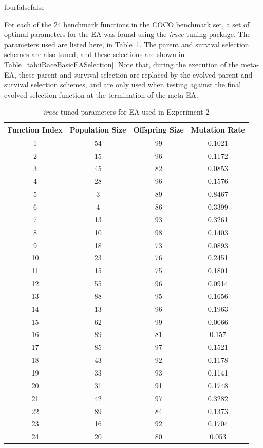 \documentclass[times,12pt,titlepage]{mstogs}
\begin{document}
\begin{ThesisAppendix}{four}{false}{false}
\label{apx:iRaceBasicEACOCOParams}

For each of the 24 benchmark functions in the COCO benchmark set, a set of optimal parameters for the EA was found using the \textit{irace} tuning package. The parameters used are listed here, in Table~\ref{tab:iRaceBasicEAParams}. The parent and survival selection schemes are also tuned, and these selections are shown in Table~\ref{tab:iRaceBasicEASelection}. Note that, during the execution of the meta-EA, these parent and survival selection are replaced by the evolved parent and survival selection schemes, and are only used when testing against the final evolved selection function at the termination of the meta-EA. 

\begin{table}
\centering
  \caption{\textit{irace} tuned parameters for EA used in Experiment 2}
  \label{tab:iRaceBasicEAParams}
  \begin{tabular}{cccc}
    \toprule
    Function Index & Population Size & Offspring Size & Mutation Rate\\
    \midrule
	1 & 54 & 99 & 0.1021\\
	\hline
	2 & 15 & 96 & 0.1172\\
	\hline
	3 & 45 & 82 & 0.0853\\
	\hline
	4 & 28 & 96 & 0.1576\\
	\hline
	5 & 3 & 89 & 0.8467\\
	\hline
	6 & 4 & 86 & 0.3399\\
	\hline
	7 & 13 & 93 & 0.3261\\
	\hline
	8 & 10 & 98 & 0.1403\\
	\hline
	9 & 18 & 73 & 0.0893\\
	\hline
	10 & 23 & 76 & 0.2451\\
	\hline
	11 & 15 & 75 & 0.1801\\
	\hline
	12 & 55 & 96 & 0.0914\\
	\hline
	13 & 88 & 95 & 0.1656\\
	\hline
	14 & 13 & 96 & 0.1963\\
	\hline
	15 & 62 & 99 & 0.0066\\
	\hline
	16 & 89 & 81 & 0.157\\
	\hline
	17 & 85 & 97 & 0.1521\\
	\hline
	18 & 43 & 92 & 0.1178\\
	\hline
	19 & 33 & 93 & 0.1141\\
	\hline
	20 & 31 & 91 & 0.1748\\
	\hline
	21 & 42 & 97 & 0.3282\\
	\hline
	22 & 89 & 84 & 0.1373\\
	\hline
	23 & 16 & 92 & 0.1704\\
	\hline
	24 & 20 & 80 & 0.053\\              
		

\end{tabular}
\end{table}
\end{ThesisAppendix}
\end{document}
